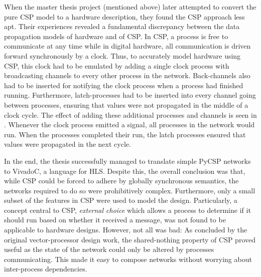 When the master thesis project (mentioned above) later attempted to convert the pure
CSP model to a hardware description, they found the CSP approach less apt.
Their experiences revealed a fundamental discrepancy between the data
propagation models of hardware and of CSP. In CSP, a process is free to
communicate at any time while in digital hardware, all communication is driven
forward synchronously by a clock.
Thus, to accurately model hardware using CSP, this clock had to be emulated by
adding a single clock process with broadcasting channels to every other process
in the network. Back-channels also had to be inserted for notifying
the clock process when a process had finished running. Furthermore,
latch-processes had to be inserted into every channel going between processes,
ensuring that values were not propagated in the middle of a clock cycle. The
effect of adding these additional processes and channels is seen in
. Whenever the clock process emitted a signal, all processes
in the network would run. When the processes completed their run, the latch
processes ensured that values were propagated in the next cycle.

In the end, the thesis successfully managed to translate simple PyCSP networks
to VivadoC, a language for HLS. Despite this, the overall conclusion was that,
while CSP could be forced to adhere by globally synchronous semantics, the
networks required to do so were prohibitively complex. Furthermore, only a small
subset of the features in CSP were used to model the design. Particularly, a
concept central to CSP, \textit{external choice} which allows a process to
determine if it should run based on whether it received a message, was not found
to be applicable to hardware designs. However, not all was bad: As concluded by
the original vector-processor design work, the shared-nothing property of CSP
proved useful as the state of the network could only be altered by processes
communicating. This made it easy to compose networks without worrying about
inter-process dependencies.

